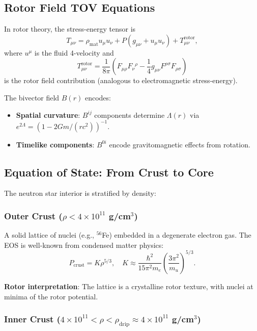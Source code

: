 \documentclass[12pt,a4paper]{article}
\theoremstyle{definition}
\theoremstyle{remark}
\begin{document}
\subsection{Rotor Field TOV Equations}

In rotor theory, the stress-energy tensor is
\begin{equation}
T_{\mu\nu} = \rho_{\text{mat}} u_\mu u_\nu + P (g_{\mu\nu} + u_\mu u_\nu) + T_{\mu\nu}^{\text{rotor}},
\end{equation}
where $u^\mu$ is the fluid 4-velocity and
\begin{equation}
T_{\mu\nu}^{\text{rotor}} = \frac{1}{8\pi} \left( F_{\mu\rho} F_\nu{}^\rho - \frac{1}{4} g_{\mu\nu} F^{\rho\sigma} F_{\rho\sigma} \right)
\end{equation}
is the rotor field contribution (analogous to electromagnetic stress-energy).

The bivector field $B(r)$ encodes:
\begin{itemize}
\item \textbf{Spatial curvature}: $B^{ij}$ components determine $\Lambda(r)$ via $e^{2\Lambda} = (1 - 2Gm/(rc^2))^{-1}$.
\item \textbf{Timelike components}: $B^{0i}$ encode gravitomagnetic effects from rotation.
\end{itemize}

\subsection{Equation of State: From Crust to Core}

The neutron star interior is stratified by density:

\subsubsection{Outer Crust ($\rho < 4 \times 10^{11}$ g/cm$^3$)}

A solid lattice of nuclei (e.g., $^{56}$Fe) embedded in a degenerate electron gas. The EOS is well-known from condensed matter physics:
\begin{equation}
P_{\text{crust}} = K \rho^{5/3}, \quad K \approx \frac{\hbar^2}{15\pi^2 m_e} \left(\frac{3\pi^2}{m_u}\right)^{5/3}.
\end{equation}

\textbf{Rotor interpretation}: The lattice is a crystalline rotor texture, with nuclei at minima of the rotor potential.

\subsubsection{Inner Crust ($4 \times 10^{11} < \rho < \rho_{\text{drip}} \approx 4 \times 10^{11}$ g/cm$^3$)}
\end{document}
